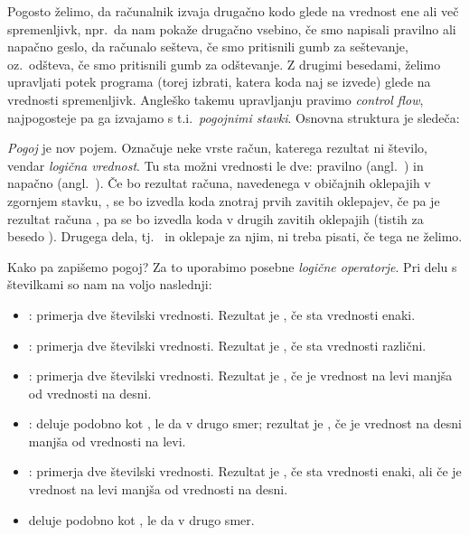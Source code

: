 
Pogosto želimo, da računalnik izvaja drugačno kodo glede na vrednost ene ali
več spremenljivk, npr.~da nam pokaže drugačno vsebino, če smo napisali
pravilno ali napačno geslo, da računalo sešteva, če smo pritisnili gumb za
seštevanje, oz.~odšteva, če smo pritisnili gumb za odštevanje.
Z drugimi besedami, želimo upravljati potek programa (torej izbrati, katera koda
naj se izvede) glede na vrednosti spremenljivk.
Angleško takemu upravljanju pravimo \emph{control flow}, najpogosteje pa ga
izvajamo s t.i.~\emph{pogojnimi stavki}.
Osnovna struktura je sledeča:


\emph{Pogoj} je nov pojem. Označuje neke vrste račun, katerega rezultat ni
število, vendar \emph{logična vrednost}.
Tu sta možni vrednosti le dve: pravilno (angl.~) in napačno
(angl.~).
Če bo rezultat računa, navedenega v običajnih oklepajih v zgornjem 
stavku, , se bo izvedla koda znotraj prvih zavitih oklepajev, če pa
je rezultat računa , pa se bo izvedla koda v drugih zavitih
oklepajih (tistih za besedo ).
Drugega dela, tj.~ in oklepaje za njim, ni treba pisati, če tega ne
želimo.

Kako pa zapišemo pogoj?
Za to uporabimo posebne \emph{logične operatorje}.
Pri delu s številkami so nam na voljo naslednji:
\begin{itemize}
\item \koda{==}: primerja dve številski vrednosti.
  Rezultat je , če sta vrednosti enaki.
\item \koda{!=}: primerja dve številski vrednosti.
  Rezultat je , če sta vrednosti različni.
\item \koda{<}: primerja dve številski vrednosti.
  Rezultat je , če je vrednost na levi manjša od vrednosti na desni.
\item \koda{>}: deluje podobno kot \koda{<}, le da v drugo smer;
  rezultat je , če je vrednost na desni manjša od vrednosti na levi.
\item \koda{<=}: primerja dve številski vrednosti.
  Rezultat je , če sta vrednosti enaki, ali če je vrednost
  na levi manjša od vrednosti na desni.
\item \koda{>=} deluje podobno kot \koda{<=}, le da v drugo smer.
\end{itemize}

